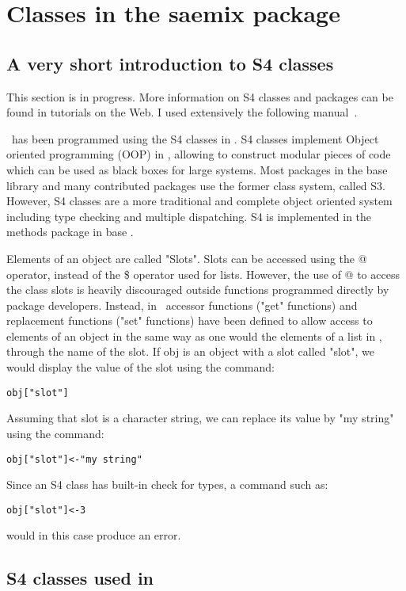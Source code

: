 
\section{Classes in the saemix package} \label{sec:techystuff}

\subsection{A very short introduction to S4 classes} \label{sec:introS4}

This section is in progress. More information on S4 classes and \R packages can be found in tutorials on the Web. I used extensively the following manual~\cite{Genolini}.

\saemix~has been programmed using the S4 classes in \R. S4 classes implement Object oriented programming (OOP) in \R, allowing to construct modular pieces of code which can be used as black boxes for large systems. Most packages in the base library and many contributed packages use the former class system, called S3. However, S4 classes are a more traditional and complete object oriented system including type checking and multiple dispatching. S4 is implemented in the methods package in base \R.

Elements of an object are called "Slots". Slots can be accessed using the @ operator, instead of the \$ operator used for lists. However, the use of @ to access the class slots is heavily discouraged outside functions programmed directly by package developers. Instead, in \saemix~accessor functions ("get" functions) and replacement functions ("set" functions) have been defined to allow access to elements of an object in the same way as one would the elements of a list in \R, through the name of the slot. If {\sf obj} is an object with a slot called "slot", we would display the value of the slot using the command:
\begin{verbatim}
obj["slot"]
\end{verbatim}
Assuming that slot is a character string, we can replace its value by "my string" using the command:
\begin{verbatim}
obj["slot"]<-"my string"
\end{verbatim}
Since an S4 class has built-in check for types, a command such as:
\begin{verbatim}
obj["slot"]<-3
\end{verbatim}
would in this case produce an error.

\subsection{S4 classes used in \saemix} \label{sec:saemixS4}

